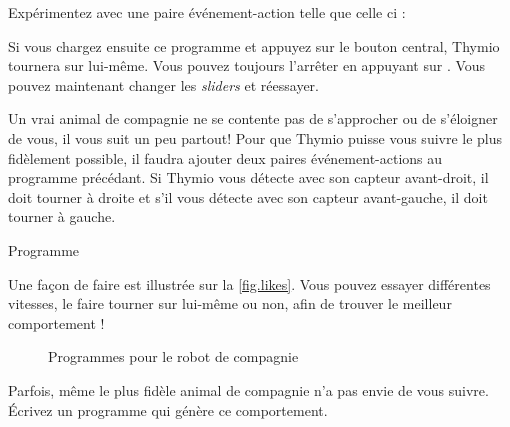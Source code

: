 \newpage

Expérimentez avec une paire événement-action telle que celle ci : 

Si vous chargez ensuite ce programme et appuyez sur le bouton central, Thymio tournera sur lui-même. Vous pouvez toujours l'arrêter en appuyant sur .
Vous pouvez maintenant changer les \textit{sliders} et réessayer.



Un vrai animal de compagnie ne se contente pas de s'approcher ou de s'éloigner de vous, il vous suit un peu partout! 
Pour que Thymio puisse vous suivre le plus fidèlement possible, il faudra ajouter deux paires événement-actions au programme précédant.
Si Thymio vous détecte avec son capteur avant-droit, il doit tourner à droite et s'il vous détecte avec son capteur avant-gauche, il doit tourner à gauche.

{\raggedleft \hfill Programme }

Une façon de faire est illustrée sur la \cref{fig.likes}.
Vous pouvez essayer différentes vitesses, le faire tourner sur lui-même ou non, afin de trouver le meilleur comportement !

\begin{figure}
	\hfill
        \caption{Programmes pour le robot de compagnie}\label{fig.likes-hates}
\end{figure}





Parfois, même le plus fidèle animal de compagnie n'a pas envie de vous suivre. 
Écrivez un programme qui génère ce comportement.

